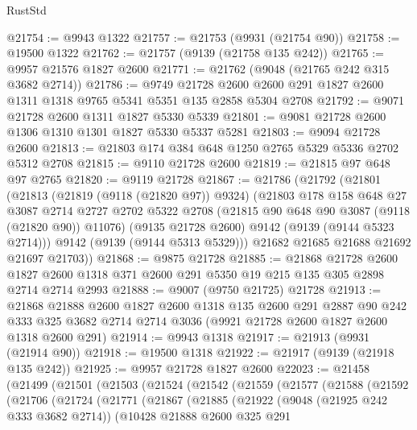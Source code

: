 \begin{lexlean}{RustStd}
\begin{coremodule}
@21754 := @9943 @1322
@21757 := @21753 (@9931 (@21754 @90))
@21758 := @19500 @1322
@21762 := @21757 (@9139 (@21758 @135 @242))
@21765 := @9957 @21576 @1827 @2600
@21771 := @21762 (@9048 (@21765 @242 @315 @3682 @2714))
@21786 := @9749
    @21728
    @2600
    @2600
    @291
    @1827
    @2600
    @1311
    @1318
    @9765
    @5341
    @5351
    @135
    @2858
    @5304
    @2708
@21792 := @9071 @21728 @2600 @1311 @1827 @5330 @5339
@21801 := @9081 @21728 @2600 @1306 @1310 @1301 @1827 @5330 @5337 @5281
@21803 := @9094 @21728 @2600
@21813 := @21803 @174 @384 @648 @1250 @2765 @5329 @5336 @2702 @5312 @2708
@21815 := @9110 @21728 @2600
@21819 := @21815 @97 @648 @97 @2765
@21820 := @9119 @21728
@21867 := @21786
    (@21792
      (@21801
        (@21813
          (@21819 (@9118 (@21820 @97)) @9324)
          (@21803
            @178
            @158
            @648
            @27
            @3087
            @2714
            @2727
            @2702
            @5322
            @2708
            (@21815 @90 @648 @90 @3087 (@9118 (@21820 @90)) @11076)
            (@9135 @21728 @2600)
            @9142
            (@9139 (@9144 @5323 @2714)))
          @9142
          (@9139 (@9144 @5313 @5329)))
        @21682
        @21685
        @21688
        @21692
        @21697
        @21703))
@21868 := @9875 @21728
@21885 := @21868
    @21728
    @2600
    @1827
    @2600
    @1318
    @371
    @2600
    @291
    @5350
    @19
    @215
    @135
    @305
    @2898
    @2714
    @2714
    @2993
@21888 := @9007 (@9750 @21725) @21728
@21913 := @21868
    @21888
    @2600
    @1827
    @2600
    @1318
    @135
    @2600
    @291
    @2887
    @90
    @242
    @333
    @325
    @3682
    @2714
    @2714
    @3036
    (@9921 @21728 @2600 @1827 @2600 @1318 @2600 @291)
@21914 := @9943 @1318
@21917 := @21913 (@9931 (@21914 @90))
@21918 := @19500 @1318
@21922 := @21917 (@9139 (@21918 @135 @242))
@21925 := @9957 @21728 @1827 @2600
@22023 := @21458
    (@21499
      (@21501
        (@21503
          (@21524
            (@21542
              (@21559
                (@21577
                  (@21588
                    (@21592
                      (@21706
                        (@21724
                          (@21771
                            (@21867
                              (@21885
                                (@21922
                                  (@9048 (@21925 @242 @333 @3682 @2714))
                                  (@10428
                                    @21888
                                    @2600
                                    @325
                                    @291

\end{coremodule}
\end{lexlean}
